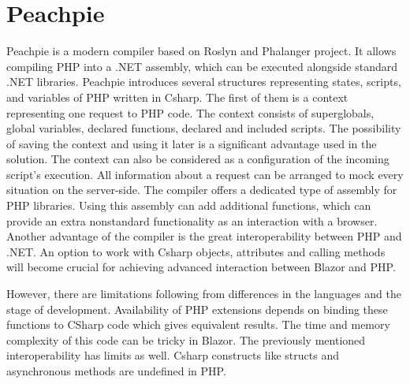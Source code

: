 \section{Peachpie}

Peachpie  is a modern compiler based on Roslyn and Phalanger project.
It allows compiling PHP into a .NET assembly, which can be executed alongside standard .NET libraries.
Peachpie introduces several structures representing states, scripts, and variables of PHP written in Csharp.
The first of them is a context representing one request to PHP code.
The context consists of superglobals, global variables, declared functions, declared and included scripts.
The possibility of saving the context and using it later is a significant advantage used in the solution.
The context can also be considered as a configuration of the incoming script's execution.
All information about a request can be arranged to mock every situation on the server-side.
The compiler offers a dedicated type of assembly for PHP libraries.
Using this assembly can add additional functions, which can provide an extra nonstandard functionality as an interaction with a browser.
Another advantage of the compiler is the great interoperability between PHP and .NET.
An option to work with Csharp objects, attributes and calling methods will become crucial for achieving advanced interaction between Blazor and PHP.

However, there are limitations following from differences in the languages and the stage of development.
Availability of PHP extensions depends on binding these functions to CSharp code which gives equivalent results. The time and memory complexity of this code can be tricky in Blazor.
The previously mentioned interoperability has limits as well.
Csharp constructs like structs and asynchronous methods are undefined in PHP.


